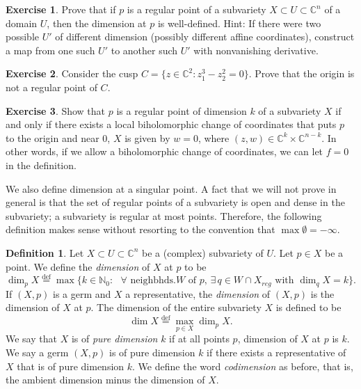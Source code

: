 \documentclass[12pt,openany]{book}
\newcommand{\C}{{\mathbb{C}}}
\newcommand{\N}{{\mathbb{N}}}
\newcommand{\myindex}[1]{#1\index{#1}}
\theoremstyle{plain}
\theoremstyle{remark}
\theoremstyle{definition}
\newtheorem{defn}[thm]{Definition}
\newenvironment{exbox}{%
    \def\FrameCommand{\vrule width 1pt \relax\hspace{10pt}}%
    \MakeFramed {\advance \hsize -\width \FrameRestore}%
}{%
    \endMakeFramed
}
\theoremstyle{exercise}
\newtheorem{exercise}{Exercise}[section]
\theoremstyle{example}
\begin{document}
\begin{exbox}
\begin{exercise}
Prove that if $p$ is a regular point of a subvariety $X \subset U \subset
\C^n$ of a domain $U$, then the dimension at $p$ is well-defined.  Hint: If there were two possible
$U'$ of different dimension (possibly different affine coordinates), construct a map
from one such $U'$ to another such $U'$ with nonvanishing derivative.
\end{exercise}

\begin{exercise}
Consider the cusp 
$C = \bigl\{ z \in \C^2 : z_1^3-z_2^2 = 0 \bigr\}$.  Prove that
the origin is not a regular point of $C$.
\end{exercise}

\begin{exercise}
Show that $p$ is a regular point of dimension $k$ of a subvariety $X$
if and only if there
exists a local biholomorphic change of coordinates that puts $p$ to the
origin and near $0$, $X$ is given by $w=0$, where $(z,w) \in \C^{k} \times
\C^{n-k}$.  In other words, if we allow a biholomorphic change of
coordinates, we can let $f=0$ in the definition.
\end{exercise}
\end{exbox}

We also define dimension at a singular point.
A fact that we will not prove in general is that
the set of regular points of a
subvariety is open and dense in the subvariety; a
subvariety is regular at most points.  Therefore, the 
following definition makes sense without resorting to
the convention that $\max \emptyset = -\infty$.

\begin{defn}
Let $X \subset U \subset \C^n$ be a (complex) subvariety of $U$.  Let $p \in
X$ be a point.  We define the \emph{\myindex{dimension}} of $X$ at $p$
to be
%
\begin{equation*}
\dim_p X \overset{\text{def}}{=}
\max \bigl\{ k \in \N_0 : \text{ $\forall$ neighbhds.
$W$ of $p$, $\exists \, q \in W \cap X_{\mathit{reg}}$ with $\dim_q X = k$}
\bigr\} .
\end{equation*}
If $(X,p)$ is a germ and $X$ a representative,
the \emph{dimension} of $(X,p)$ is the dimension of
$X$ at $p$.
The dimension of the entire subvariety $X$ is defined to be
%
\begin{equation*}
\dim X \overset{\text{def}}{=}
\max_{p \in X} \dim_p X .
\end{equation*}
We say that $X$ is of \emph{\myindex{pure dimension}} $k$ if at
all points $p$, dimension of $X$ at $p$ is $k$.  
We say a germ $(X,p)$ is of pure dimension $k$ if there exists a representative
of $X$ that is of pure dimension $k$.
We define the word \emph{codimension} as before, that is, the
ambient dimension minus the dimension of $X$.
\end{defn}
\end{document}
